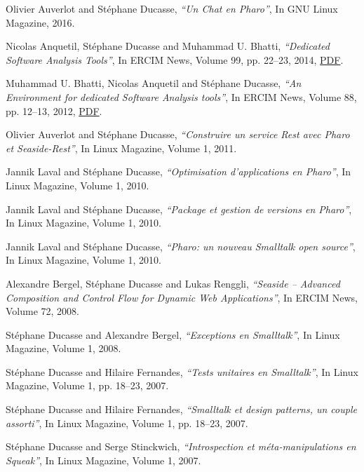 \documentclass{article}
\newcommand{\czauthors}[1]{#1}
\newcommand{\cztitle}[1]{\emph{``#1''}}
\newcommand{\czjournal}[1]{#1}
\begin{document}
\begin{itemize}

	\pub  \czauthors{Olivier Auverlot and St\'ephane Ducasse},  \cztitle{Un Chat en Pharo},  In \czjournal{GNU Linux Magazine}, 2016.

	\pub  \czauthors{Nicolas Anquetil, St\'ephane Ducasse and Muhammad U. Bhatti},  \cztitle{Dedicated Software Analysis Tools},  In \czjournal{ERCIM News}, Volume 99, pp. 22--23, 2014, \href{http://rmod-files.lille.inria.fr/Team/Texts/Papers//Anqu14a-Ercim-EN99-web.pdf}{PDF}.

	\pub  \czauthors{Muhammad U. Bhatti, Nicolas Anquetil and St\'ephane Ducasse},  \cztitle{An Environment for dedicated Software Analysis tools},  In \czjournal{ERCIM News}, Volume 88, pp. 12--13, 2012, \href{http://ercim-news.ercim.eu/images/stories/EN88/EN88-web.pdf}{PDF}.

	\pub  \czauthors{Olivier Auverlot and St\'ephane Ducasse},  \cztitle{Construire un service Rest avec Pharo et Seaside-Rest},  In \czjournal{Linux Magazine}, Volume 1, 2011.

	\pub  \czauthors{Jannik Laval and St\'ephane Ducasse},  \cztitle{Optimisation d'applications en Pharo},  In \czjournal{Linux Magazine}, Volume 1, 2010.

	\pub  \czauthors{Jannik Laval and St\'ephane Ducasse},  \cztitle{Package et gestion de versions en Pharo},  In \czjournal{Linux Magazine}, Volume 1, 2010.

	\pub  \czauthors{Jannik Laval and St\'ephane Ducasse},  \cztitle{Pharo: un nouveau Smalltalk open source},  In \czjournal{Linux Magazine}, Volume 1, 2010.

	\pub  \czauthors{Alexandre Bergel, St\'ephane Ducasse and Lukas Renggli},  \cztitle{Seaside -- Advanced Composition and Control Flow for Dynamic Web Applications},  In \czjournal{ERCIM News}, Volume 72, 2008.

	\pub  \czauthors{St\'ephane Ducasse and Alexandre Bergel},  \cztitle{Exceptions en Smalltalk},  In \czjournal{Linux Magazine}, Volume 1, 2008.

	\pub  \czauthors{St\'ephane Ducasse and Hilaire Fernandes},  \cztitle{Tests unitaires en Smalltalk},  In \czjournal{Linux Magazine}, Volume 1, pp. 18--23, 2007.

	\pub  \czauthors{St\'ephane Ducasse and Hilaire Fernandes},  \cztitle{Smalltalk et design patterns, un couple assorti},  In \czjournal{Linux Magazine}, Volume 1, pp. 18--23, 2007.

	\pub  \czauthors{St\'ephane Ducasse and Serge Stinckwich},  \cztitle{Introspection et m\'eta-manipulations en Squeak},  In \czjournal{Linux Magazine}, Volume 1, 2007.


\end{itemize}
\end{document}
